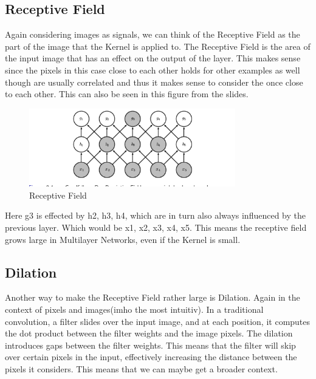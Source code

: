 \documentclass[a4paper]{article}
\begin{document}
\subsection{Receptive Field}
Again considering images as signals, we can think of the Receptive Field as the part of the image that the Kernel is applied to. The Receptive Field is the area of the input image that has an effect on the output of the layer. This makes sense since the pixels in this case close to each other holds for other examples as well though are usually correlated 
and thus it makes sense to consider the once close to each other. This can also be seen in this figure from the slides.
\begin{figure}[h]
    \centering
    \includegraphics[width=0.8\textwidth]{images/receptive_field.png}
    \caption{Receptive Field}
    \label{fig:Receptive Field}
\end{figure}
Here g3 is effected by h2, h3, h4, which are in turn also always influenced by the previous layer. Which would be x1, x2, x3, x4, x5. This means the receptive field grows large in Multilayer Networks, even if the Kernel is small. 

\subsection{Dilation}
Another way to make the Receptive Field rather large is Dilation. Again in the context of pixels and images(imho the most intuitiv). In a traditional convolution, a filter slides over the input image, and at each position, it computes the dot product between the filter weights and the image pixels. The dilation introduces gaps between the filter weights. This means that the filter will skip over certain pixels in the input, effectively increasing the distance between the pixels it considers. This means that we can maybe get a broader context. 
\end{document}
